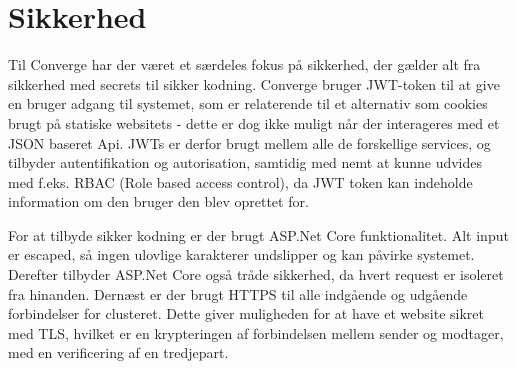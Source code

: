 \chapter{Sikkerhed}

Til Converge har der været et særdeles fokus på sikkerhed, der gælder alt fra sikkerhed med secrets til sikker kodning. Converge bruger JWT-token til at give en bruger adgang til systemet, som er relaterende til et alternativ som cookies brugt på statiske websitets - dette er dog ikke muligt når der interageres med et JSON baseret Api. JWTs er derfor brugt mellem alle de forskellige services, og tilbyder autentifikation og autorisation, samtidig med nemt at kunne udvides med f.eks. RBAC (Role based access control), da JWT token kan indeholde information om den bruger den blev oprettet for.

For at tilbyde sikker kodning er der brugt ASP.Net Core funktionalitet. Alt input er escaped, så ingen ulovlige karakterer undslipper og kan påvirke systemet. Derefter tilbyder ASP.Net Core også tråde sikkerhed, da hvert request er isoleret fra hinanden. Dernæst er der brugt HTTPS til alle indgående og udgående forbindelser for clusteret. Dette giver muligheden for at have et website sikret med TLS, hvilket er en krypteringen af forbindelsen mellem sender og modtager, med en verificering af en tredjepart.
